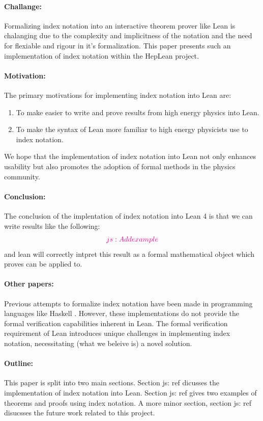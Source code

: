 \documentclass[a4paper, 11pt]{article}
\newcommand{\js}[1]{ {\color{magenta} js:  #1}}
\begin{document}
\paragraph{Challange:} Formalizing index notation into an interactive theorem prover like Lean 
is chalanging due to the complexity and implicitness 
of the notation and the need for flexiable  and rigour in it's formalization. 
This paper presents such an implementation of index notation within the HepLean project.


\paragraph{Motivation:} The primary motivations for implementing index notation into Lean are:
\begin{enumerate}
  \item To make easier to write and prove results from high energy physics into Lean. 
  \item To make the syntax of Lean more familiar to high energy physicists use to index notation.
\end{enumerate}
We hope that the implementation  of index notation into Lean
not only enhances usability but also promotes the adoption of formal methods in the 
physics community.

\paragraph{Conclusion:} The conclusion of the implentation of index notation into Lean 4 is that 
we can write results like the following: 
\begin{equation}
\js{Add example}
\end{equation}
and lean will correctly intpret this result as a formal mathematical object which proves can be 
applied to.


\paragraph{Other papers:}
Previous attempts to formalize index notation have been made in programming languages like Haskell 
\cite{haskell-index-notation}. However, these implementations do not
 provide the formal verification capabilities inherent in Lean. 
 The formal verification requirement of Lean introduces unique challenges in implementing index 
 notation, necessitating (what we beleive is) a novel solution.


\paragraph{Outline:} This paper is split into two main sections. Section \js{ref} dicusses 
the implementation of index notation into Lean. Section \js{ref} gives two examples 
of theorems and proofs using index notation. A more minor section, section \js{ref} disucsses 
the future work related to this project.
\end{document}
